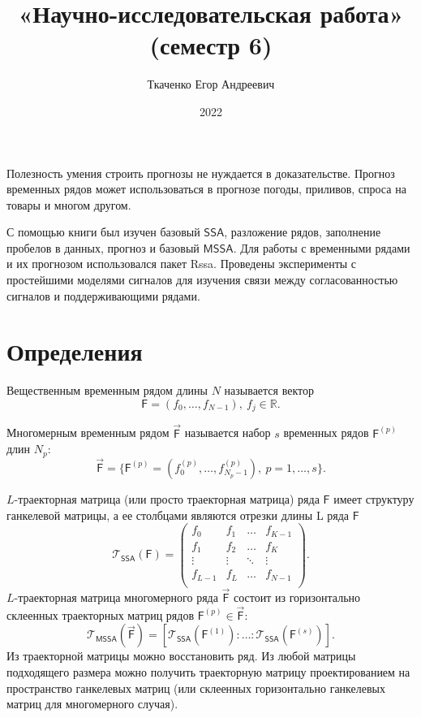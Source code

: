 \documentclass[specialist, substylefile = spbureport.rtx,
    subf,href,colorlinks=true, 12pt]{disser}
\title{«Научно-исследовательская работа» (семестр 6)}
\author{Ткаченко Егор Андреевич}
\date{2022}
\newcommand{\T}{\mathcal{T}}
\newcommand{\F}{\mathsf{F}}
\newcommand{\MF}{\vec{\F}}
\newcommand{\SSA}{\mathsf{SSA}}
\newcommand{\MSSA}{\mathsf{MSSA}}
\begin{document}
    \maketitle
    \pagebreak
    \tableofcontents
    \pagebreak

    \intro
        Полезность умения строить прогнозы не нуждается в доказательстве. Прогноз временных рядов может использоваться в прогнозе погоды, приливов, спроса на товары и многом другом.
         
        С помощью книги \cite{SSA_with_R} был изучен базовый $\SSA$, разложение рядов, заполнение пробелов в данных, прогноз и базовый $\MSSA$. Для работы с временными рядами и их прогнозом использовался пакет Rssa. Проведены эксперименты с простейшими моделями сигналов для изучения связи между согласованностью сигналов и поддерживающими рядами.



    \section{Определения}
        Вещественным временным рядом длины $N$ называется вектор
        $$\F = (f_0, \dots, f_{N - 1}),\ f_j \in \mathbb{R}.$$

        Многомерным временным рядом $\MF$ называется набор $s$ временных рядов $\F^{(p)}$ длин $N_p$:
        $$\MF = \{\F^{(p)} = (f^{(p)}_0, \dots, f^{(p)}_{N_p - 1}),\ p=1, \dots, s\}.$$

        $L$-траекторная матрица (или просто траекторная матрица) ряда $\F$ имеет структуру ганкелевой матрицы, а ее столбцами являются отрезки длины L ряда $\F$
        $$\T_{\SSA}(\F) =
        \begin{pmatrix}
            f_0     & f_1    & \dots  & f_{K-1} \\
            f_1     & f_2    & \dots  & f_K     \\
            \vdots  & \vdots & \ddots & \vdots  \\
            f_{L-1} & f_L    & \dots  & f_{N-1} \\
        \end{pmatrix}.$$
        $L$-траекторная матрица многомерного ряда $\MF$ состоит из горизонтально склеенных траекторных матриц рядов $\F^{(p)} \in \MF$:
        $$\T_{\MSSA}(\MF) = [\T_{\SSA}(\F^{(1)}): \dotso :\T_{\SSA}(\F^{(s)})].$$
        Из траекторной матрицы можно восстановить ряд. Из любой матрицы подходящего размера можно получить траекторную матрицу проектированием на пространство ганкелевых матриц (или склеенных горизонтально ганкелевых матриц для многомерного случая).
\end{document}
